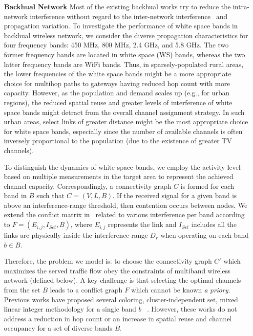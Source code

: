 \textbf{Backhual Network} Most of the existing backhual works try to reduce the intra-network interference 
without regard to the inter-network interference~\cite{si2010overview,doraghinejad2014channel} and propagation
variation. To investigate the performance of white space bands in backhual wireless network, we consider the 
diverse propagation characteristics for four frequency bands: 450 MHz, 800 MHz, 2.4 GHz, and 5.8 GHz. The two 
former frequency bands are located in white space (WS) bands, whereas the two latter frequency bands are WiFi 
bands. Thus, in sparsely-populated rural areas, the lower frequencies of the white space bands might be a more 
appropriate choice for multihop paths to gateways having reduced hop count with more capacity. However, as the 
population and demand scales up (e.g., for urban regions), the reduced spatial reuse and greater levels of 
interference of white space bands might detract from the overall channel assignment strategy. In such urban 
areas, select links of greater distance might be the most appropriate choice for white space bands, especially 
since the number of available channels is often inversely proportional to the population (due to the existence 
of greater TV channels).

To distinguish the dynamics of white space bands, we employ the activity level based on multiple measurements 
in the target area to represent the achieved channel capacity. Correspondingly, a connectivity graph $C$ is 
formed for each band in $B$ such that $C=(V,L,B)$.  If the received signal for a given band is above an 
interference-range threshold, then contention occurs between nodes. We extend the conflict matrix in~\cite{tang2005interference} 
related to various interference per band according to $F=(E_{i,j},I_{Set},B)$, where $E_{i,j}$ represents the 
link and $I_{Set}$ includes all the links are physically inside the interference range $D_r$ when operating on 
each band $b \in B$.

Therefore, the problem we model is: to choose the connectivity graph $C'$ which maximizes the served traffic flow obey 
the constraints of multiband wireless network (defined below). A key challenge is that selecting the optimal channels from
the set $B$ leads to a conflict graph $F$ which cannot be known {\it a priory}. Previous works have proposed several 
coloring, cluster-independent set, mixed linear integer methodology for a single band $b$ 
~\cite{peng2012efficient,tang2005interference,doraghinejad2014channel}. 
However, these works do not address a reduction in hop count or an increase in spatial reuse and channel occupancy for 
a set of diverse bands $B$. 

